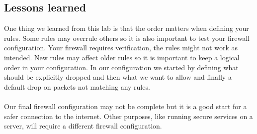 \subsection{Lessons learned}
One thing we learned from this lab is that the order matters when defining your rules. Some rules may overrule others so it is also important to test your firewall configuration. Your firewall requires verification, the rules might not work as intended. New rules may affect older rules so it is important to keep a logical order in your configuration. In our configuration we started by defining what should be explicitly dropped and then what we want to allow and finally a default drop on packets not matching any rules.
\\
\\
Our final firewall configuration may not be complete but it is a good start for a safer connection to the internet. Other purposes, like running secure services on a server, will require a different firewall configuration.




